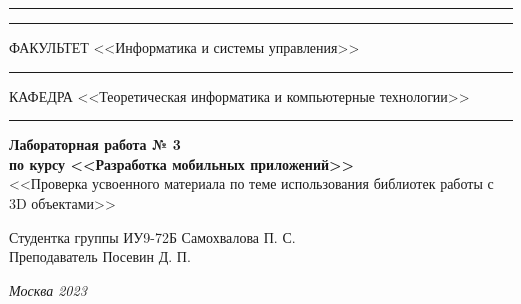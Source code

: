 \documentclass[a4paper, 14pt]{extarticle}
\begin{document}
\begin{titlepage}
\vspace{-25pt}
\hspace{-35pt}\rule{\textwidth}{2.3pt}

\vspace*{-20.3pt}
\hspace{-35pt}\rule{\textwidth}{0.4pt}

\vspace{1.5ex}
\hspace{-35pt} \noindent \small ФАКУЛЬТЕТ\hspace{80pt} <<Информатика и системы управления>>

\vspace*{-16pt}
\hspace{47pt}\rule{0.83\textwidth}{0.4pt}

\vspace{0.5ex}
\hspace{-35pt} \noindent \small КАФЕДРА\hspace{50pt} <<Теоретическая информатика и компьютерные технологии>>

\vspace*{-16pt}
\hspace{30pt}\rule{0.866\textwidth}{0.4pt}
  
\vspace{11em}

\begin{center}
\Large {\bf Лабораторная работа № 3} \\
\large {\bf по курсу <<Разработка мобильных приложений>>} \\
\large <<Проверка усвоенного материала по теме использования библиотек  работы с 3D объектами>>
\end{center}\normalsize

\vspace{8em}


\begin{flushright}
  {Студентка группы ИУ9-72Б Самохвалова П. С. \hspace*{15pt}\\
  \vspace{2ex}
  Преподаватель Посевин Д. П.\hspace*{15pt}}
\end{flushright}

\bigskip

\vfill
 

\begin{center}
\textsl{Москва 2023}
\end{center}
\end{titlepage}
\end{document}
